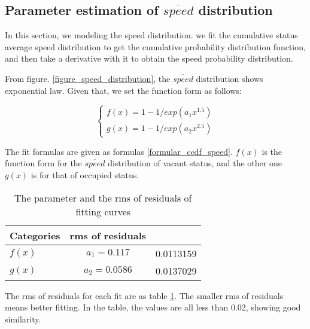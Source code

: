 \subsection{Parameter estimation of $\overline{speed}$ distribution}
\label{section_speed_modeling}
In this section, we modeling the speed distribution. we fit the cumulative status average speed distribution to get the cumulative probability distribution function, and then take a derivative with it to obtain the speed probability distribution.

From figure. \ref{figure_speed_distribution}, the $\overline{speed}$ distribution shows exponential law. Given that, we set the function form as follows:

\begin{equation}\label{formular_ccdf_speed}
\left\{
\begin{array}{ll}
f(x) = 1-1/exp(a_1x^{1.5})\\
g(x) = 1-1/exp(a_2x^{2.5})
\end{array}
\right.
\end{equation}

The fit formulas are given as formulas \ref{formular_ccdf_speed}. $f(x)$ is the function form for the $\overline{speed}$ distribution of vacant status, and the other one $g(x)$ is for that of occupied status.

\begin{table}[!h]
\caption{The parameter and the rms of residuals of fitting curves}\label{table_rms}
\centering
\begin{tabular}{l|c|c}
  \hline
  Categories & rms of residuals  \\
  \hline
  $f(x)$ &$a_1=0.117$ &0.0113159\\
  $g(x)$ &$a_2=0.0586$ &0.0137029\\
  \hline
\end{tabular}
\end{table}

The rms of residuals for each fit are as table \ref{table_rms}. The smaller rms of residuals means better fitting.
In the table, the values are all less than 0.02, showing good similarity.


